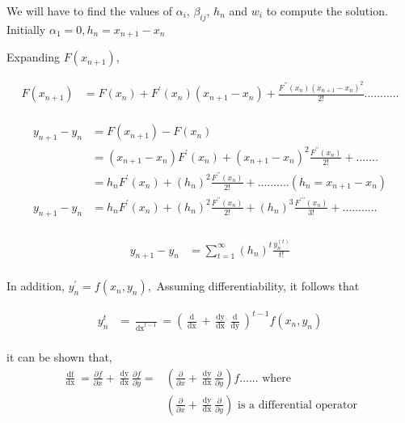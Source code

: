 \documentclass[12 pt]{article}
\begin{document}
We will have to find the values of $\alpha_{i}$, $\beta_{ij}$, $h_{n}$ and $w_{i}$ to compute the solution. Initially $\alpha_{1} = 0, h_{n}=x_{n+1}-x_{n}$

Expanding $F(x_{n+1})$,

{
\Large
\begin{align*}
F(x_{n+1}) &= F(x_{n}) + F^{\prime}(x_{n})(x_{n+1}-x_{n}) + \frac{F^{\prime\prime}(x_{n})(x_{n+1}-x_{n})^{2}}{2!}...........\\
\end{align*}
}

{
\Large
\begin{equation}
\begin{split}
y_{n+1}-y_{n} &= F(x_{n+1})-F(x_{n}) \\
			  &= (x_{n+1}-x_{n})F^{\prime}(x_{n}) + (x_{n+1}-x_{n})^{2} \frac{F^{\prime\prime}(x_{n})}{2!} + ....... \\
			  &= h_{n}F^{\prime}(x_{n}) + (h_{n})^{2}\frac{F^{\prime\prime}(x_{n})}{2!} + .......... (h_{n} = x_{n+1} - x_{n})\\
y_{n+1}-y_{n} &= h_{n}F^{\prime}(x_{n}) + (h_{n})^{2}\frac{F^{\prime\prime}(x_{n})}{2!} + (h_{n})^{3}\frac{F^{\prime\prime\prime}(x_{n})}{3!} + ........... \\
\end{split}
\end{equation}
}

{
\Large
\begin{equation}\label{E5}
\begin{split}
y_{n+1}-y_{n} &= \sum_{t = 1}^{\infty}(h_{n})^{t}\frac{y_{n}^{(t)}}{t!}\\
\end{split}
\end{equation}
}

In addition, $y_{n}^{\prime} = f(x_{n},y_{n}),$ Assuming differentiability, it follows that 

{
\Large
\begin{equation}\label{E4}
\begin{split}
y_{n}^{t} &= \frac{\mathop{\mathrm{d}^{t-1}}}{\mathop{\mathrm{dx}}^{t-1}} = (\frac{\mathop{\mathrm{d}}}{\mathop{\mathrm{dx}}} + \frac{\mathop{\mathrm{dy}}}{\mathop{\mathrm{dx}}}\frac{\mathop{\mathrm{d}}}{\mathop{\mathrm{dy}}})^{t-1}f(x_{n},y_{n})\\
\end{split}
\end{equation}
}

it can be shown that, 
{
\Large
\begin{equation*}
\begin{split}
\frac{\mathop{\mathrm{df}}}{\mathop{\mathrm{dx}}} = \frac{\partial f}{\partial x} + \frac{\mathop{\mathrm{dy}}}{\mathop{\mathrm{dx}}}\frac{\partial f}{\partial y} =&  (\frac{\partial }{\partial x} + \frac{\mathop{\mathrm{dy}}}{\mathop{\mathrm{dx}}}\frac{\partial }{\partial y})f \text{...... where }\\
& (\frac{\partial }{\partial x} + \frac{\mathop{\mathrm{dy}}}{\mathop{\mathrm{dx}}}\frac{\partial }{\partial y}) \text{ is a differential operator}\\
\end{split}
\end{equation*}
}
\end{document}
